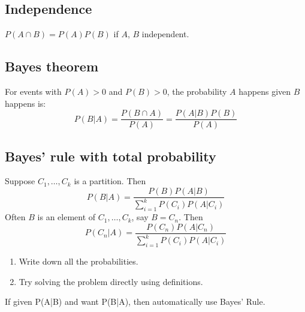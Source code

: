 \subsection{Independence}
    \begin{definition}
        $P(A \cap B) = P(A)P(B)$ if $A$, $B$ independent.
    \end{definition}

\subsection{Bayes theorem}
    \begin{definition}
        For events with $P(A)>0$ and $P(B)>0$, the probability $A$ happens given $B$ happens is:
        \begin{equation}
            P(B|A) = \frac{P(B\cap A)}{P(A)} = \frac{P(A|B)P(B)}{P(A)}
        \end{equation}
    \end{definition}

\subsection{Bayes' rule with total probability}
    \begin{definition}
        Suppose $C_1,\ldots,C_k$ is a partition. Then 
        \begin{equation}
            P(B|A) = \frac{P(B)P(A|B)}{\sum_{i=1}^{k} P\left(C_i\right)P\left(A|C_i\right)}
        \end{equation}
        Often $B$ is an element of $C_1,\ldots,C_k$, say $B=C_n$. Then 
        \begin{equation}
            P\left(C_n|A\right) = \frac{P\left(C_n\right)P\left(A|C_n\right)}{\sum_{i=1}^{k} P\left(C_i\right)P\left(A|C_i\right)}
        \end{equation}
    \end{definition}

    \begin{process}
        \begin{enumerate}
            \item Write down all the probabilities. 
            \item Try solving the problem directly using definitions. 
        \end{enumerate}
    \end{process}

    \begin{intuition}
        If given P(A|B) and want P(B|A), then automatically use Bayes’ Rule. 
    \end{intuition}

